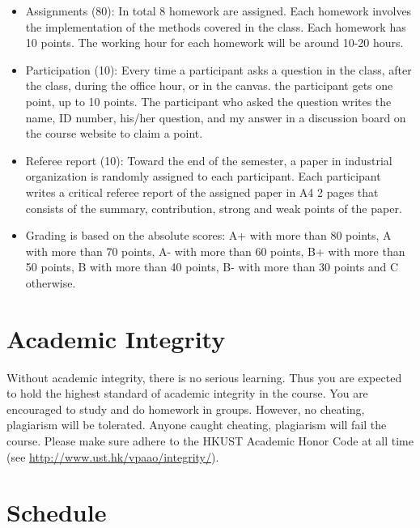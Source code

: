 \documentclass[
]{book}
\providecommand{\tightlist}{%
  \setlength{\itemsep}{0pt}\setlength{\parskip}{0pt}}
\begin{document}
\begin{itemize}
\tightlist
\item
  Assignments (80): In total 8 homework are assigned. Each homework involves the implementation of the methods covered in the class. Each homework has 10 points. The working hour for each homework will be around 10-20 hours.
\item
  Participation (10): Every time a participant asks a question in the class, after the class, during the office hour, or in the canvas. the participant gets one point, up to 10 points. The participant who asked the question writes the name, ID number, his/her question, and my answer in a discussion board on the course website to claim a point.
\item
  Referee report (10): Toward the end of the semester, a paper in industrial organization is randomly assigned to each participant. Each participant writes a critical referee report of the assigned paper in A4 2 pages that consists of the summary, contribution, strong and weak points of the paper.
\item
  Grading is based on the absolute scores: A+ with more than 80 points, A with more than 70 points, A- with more than 60 points, B+ with more than 50 points, B with more than 40 points, B- with more than 30 points and C otherwise.
\end{itemize}

\hypertarget{academic-integrity}{%
\section{Academic Integrity}\label{academic-integrity}}

Without academic integrity, there is no serious learning. Thus you are expected to hold the highest standard of academic integrity in the course. You are encouraged to study and do homework in groups. However, no cheating, plagiarism will be tolerated. Anyone caught
cheating, plagiarism will fail the course. Please make sure adhere to the HKUST Academic
Honor Code at all time (see \url{http://www.ust.hk/vpaao/integrity/}).

\hypertarget{schedule}{%
\section{Schedule}\label{schedule}}
\end{document}
